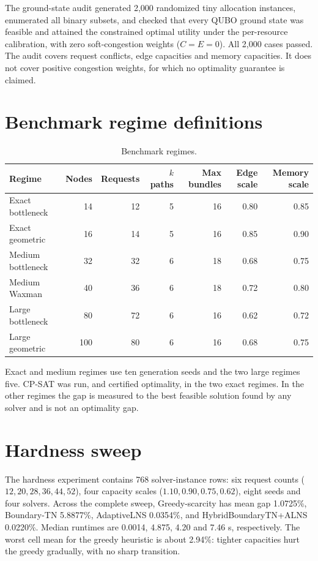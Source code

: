 \documentclass[pdflatex,sn-nature]{sn-jnl}
\begin{document}
The ground-state audit generated 2,000 randomized tiny allocation instances, enumerated all binary subsets, and checked that every QUBO ground state was feasible and attained the constrained optimal utility under the per-resource calibration, with zero soft-congestion weights ($C=E=0$). All 2,000 cases passed. The audit covers request conflicts, edge capacities and memory capacities. It does not cover positive congestion weights, for which no optimality guarantee is claimed.

\section{Benchmark regime definitions}
\begin{table}[h]
\caption{Benchmark regimes.}\centering\small
\begin{tabular}{@{}lrrrrrr@{}}
\toprule
Regime & Nodes & Requests & $k$ paths & Max bundles & Edge scale & Memory scale\\
\midrule
Exact bottleneck & 14 & 12 & 5 & 16 & 0.80 & 0.85\\
Exact geometric & 16 & 14 & 5 & 16 & 0.85 & 0.90\\
Medium bottleneck & 32 & 32 & 6 & 18 & 0.68 & 0.75\\
Medium Waxman & 40 & 36 & 6 & 18 & 0.72 & 0.80\\
Large bottleneck & 80 & 72 & 6 & 16 & 0.62 & 0.72\\
Large geometric & 100 & 80 & 6 & 16 & 0.68 & 0.75\\
\bottomrule
\end{tabular}
\end{table}
Exact and medium regimes use ten generation seeds and the two large regimes five. CP-SAT was run, and certified optimality, in the two exact regimes. In the other regimes the gap is measured to the best feasible solution found by any solver and is not an optimality gap.

\section{Hardness sweep}
The hardness experiment contains 768 solver-instance rows: six request counts ($12,20,28,36,44,52$), four capacity scales ($1.10,0.90,0.75,0.62$), eight seeds and four solvers. Across the complete sweep, Greedy-scarcity has mean gap 1.0725\%, Boundary-TN 5.8877\%, AdaptiveLNS 0.0354\%, and HybridBoundaryTN+ALNS 0.0220\%. Median runtimes are 0.0014, 4.875, 4.20 and 7.46 s, respectively. The worst cell mean for the greedy heuristic is about 2.94\%: tighter capacities hurt the greedy gradually, with no sharp transition.
\end{document}
